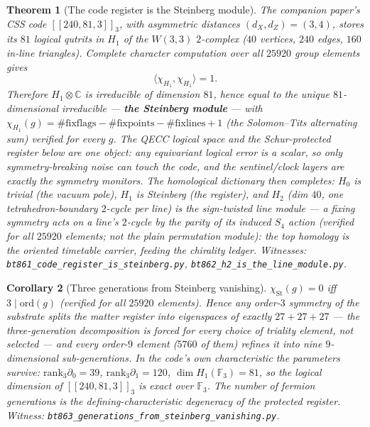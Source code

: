 \documentclass[11pt]{article}
\newtheorem{theorem}{Theorem}[section]
\newtheorem{corollary}[theorem]{Corollary}
\newcommand{\W}{W(3,3)}
\newcommand{\GF}[1]{\mathbb{F}_{#1}}
\begin{document}
\begin{theorem}[The code register is the Steinberg module]
The companion paper's CSS code $[[240,81,3]]_3$, with asymmetric distances
$(d_X,d_Z)=(3,4)$, stores its $81$
logical qutrits in $H_1$ of the $\W$ $2$-complex ($40$ vertices,
$240$ edges, $160$ in-line triangles).  Complete character
computation over all $25920$ group elements gives
\[
\langle\chi_{H_1},\chi_{H_1}\rangle=1.
\]
Therefore $H_1\otimes\mathbb{C}$ is
\emph{irreducible} of dimension $81$, hence equal to the unique
$81$-dimensional irreducible --- \textbf{the Steinberg module} ---
with $\chi_{H_1}(g)=\#\mathrm{fixflags}-\#\mathrm{fixpoints}
-\#\mathrm{fixlines}+1$ (the Solomon--Tits alternating sum) verified
for every $g$.  The QECC logical space and the Schur-protected
register below are one object: any equivariant logical error is a
scalar, so only symmetry-breaking noise can touch the code, and the
sentinel/clock layers are exactly the symmetry monitors.  The
homological dictionary then completes: $H_0$ is trivial (the vacuum
pole), $H_1$ is Steinberg (the register), and $H_2$ (dim $40$, one
tetrahedron-boundary $2$-cycle per line) is the \emph{sign-twisted}
line module --- a fixing symmetry acts on a line's $2$-cycle by the
parity of its induced $S_4$ action (verified for all $25920$
elements; \emph{not} the plain permutation module): the top homology
is the \emph{oriented} timetable carrier, feeding the chirality
ledger.
\emph{Witnesses: \texttt{bt861\_code\_register\_is\_steinberg.py},
\texttt{bt862\_h2\_is\_the\_line\_module.py}.}
\end{theorem}

\begin{corollary}[Three generations from Steinberg vanishing]
$\chi_{\mathrm{St}}(g)=0$ iff $3\mid\mathrm{ord}(g)$ (verified for
all $25920$ elements).  Hence \emph{any} order-$3$ symmetry of the
substrate splits the matter register into eigenspaces of exactly
$27+27+27$ --- the three-generation decomposition is forced for
every choice of triality element, not selected --- and every
order-$9$ element ($5760$ of them) refines it into nine
$9$-dimensional sub-generations.  In the code's own characteristic
the parameters survive: $\mathrm{rank}_3\partial_0=39$,
$\mathrm{rank}_3\partial_1=120$, $\dim H_1(\GF3)=81$, so the logical
dimension of $[[240,81,3]]_3$ is exact over $\GF3$.  The number of fermion
generations is the defining-characteristic degeneracy of the
protected register.
\emph{Witness:
\texttt{bt863\_generations\_from\_steinberg\_vanishing.py}.}
\end{corollary}
\end{document}
